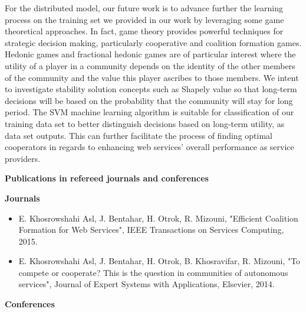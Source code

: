 For the distributed model, our future work is to advance further the learning process on the training set we provided in our work by leveraging some game theoretical approaches. In fact, game theory provides powerful techniques for strategic decision making, particularly cooperative and coalition formation games. Hedonic games and fractional hedonic games are of particular interest where the utility of a player in a community depends on the identity of the other members of the community and the value this player ascribes to those members. We intent to investigate stability solution concepts such as Shapely value so that long-term decisions will be based on the probability that the community will stay for long period. The SVM machine learning algorithm is suitable for classification of our training data set to better distinguish  decisions based on long-term utility, as data set outputs. This can further facilitate the process of finding optimal cooperators in regards to enhancing web services' overall performance as service providers.

\newpage
\textbf{Publications in refereed journals and conferences}

\textbf{Journals}

\begin{itemize}
\item E. Khosrowshahi Asl, J. Bentahar, H. Otrok, R. Mizouni, "Efficient Coalition Formation for Web Services", IEEE Transactions on Services Computing, 2015.

\item E. Khosrowshahi Asl, J. Bentahar, H. Otrok, B. Khosravifar, R. Mizouni, "To compete or cooperate? This is the question in communities of autonomous services", Journal of Expert Systems with Applications, Elsevier, 2014.


\end{itemize}

\textbf{Conferences}

